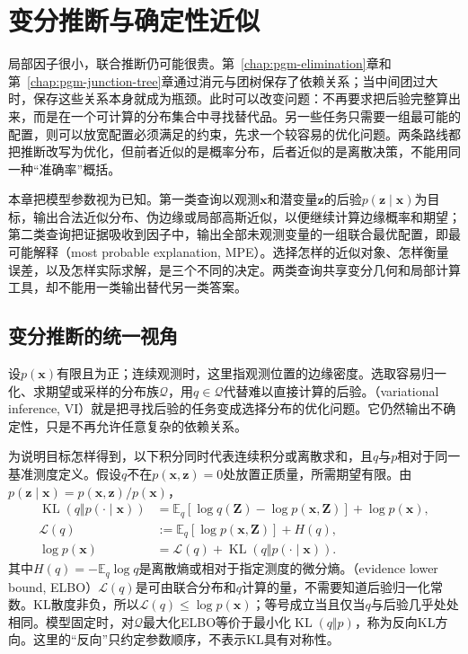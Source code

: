 \chapter{变分推断与确定性近似}
\label{chap:pgm-variational}

局部因子很小，联合推断仍可能很贵。第~\ref{chap:pgm-elimination}章和第~\ref{chap:pgm-junction-tree}章通过消元与团树保存了依赖关系；当中间团过大时，保存这些关系本身就成为瓶颈。此时可以改变问题：不再要求把后验完整算出来，而是在一个可计算的分布集合中寻找替代品。另一些任务只需要一组最可能的配置，则可以放宽配置必须满足的约束，先求一个较容易的优化问题。两条路线都把推断改写为优化，但前者近似的是概率分布，后者近似的是离散决策，不能用同一种“准确率”概括。

本章把模型参数视为已知。第一类查询以观测$\bm{x}$和潜变量$\bm{z}$的后验$p(\bm{z}\mid\bm{x})$为目标，输出合法近似分布、伪边缘或局部高斯近似，以便继续计算边缘概率和期望；第二类查询把证据吸收到因子中，输出全部未观测变量的一组联合最优配置，即最可能解释（most probable explanation, MPE）。选择怎样的近似对象、怎样衡量误差，以及怎样实际求解，是三个不同的决定。两类查询共享变分几何和局部计算工具，却不能用一类输出替代另一类答案。

\section{变分推断的统一视角}
\label{sec:pgm-variational-unified}
\label{sec:pgm-variational-duality}

设$p(\bm{x})$有限且为正；连续观测时，这里指观测位置的边缘密度。选取容易归一化、求期望或采样的分布族$\mathcal Q$，用$q\in\mathcal Q$代替难以直接计算的后验。（variational inference, VI）就是把寻找后验的任务变成选择分布的优化问题。它仍然输出不确定性，只是不再允许任意复杂的依赖关系。

为说明目标怎样得到，以下积分同时代表连续积分或离散求和，且$q$与$p$相对于同一基准测度定义。假设$q$不在$p(\bm{x},\bm{z})=0$处放置正质量，所需期望有限。由$p(\bm{z}\mid\bm{x})=p(\bm{x},\bm{z})/p(\bm{x})$，
\begin{equation}
  \begin{aligned}
    \operatorname{KL}(q\Vert p(\cdot\mid\bm{x}))
      &=\mathbb E_q\!\left[\log q(\bm{Z})
          -\log p(\bm{x},\bm{Z})\right]+\log p(\bm{x}),\\
    \mathcal L(q)
      &:=\mathbb E_q[\log p(\bm{x},\bm{Z})]+H(q),\\
    \log p(\bm{x})
      &=\mathcal L(q)+\operatorname{KL}(q\Vert p(\cdot\mid\bm{x})).
  \end{aligned}
  \label{eq:pgm-variational-elbo}
\end{equation}
其中$H(q)=-\mathbb E_q\log q$是离散熵或相对于指定测度的微分熵。（evidence lower bound, ELBO）$\mathcal L(q)$是可由联合分布和$q$计算的量，不需要知道后验归一化常数。KL散度非负，所以$\mathcal L(q)\leq\log p(\bm{x})$；等号成立当且仅当$q$与后验几乎处处相同。模型固定时，对$\mathcal Q$最大化ELBO等价于最小化$\operatorname{KL}(q\Vert p)$，称为反向KL方向。这里的“反向”只约定参数顺序，不表示KL具有对称性。

